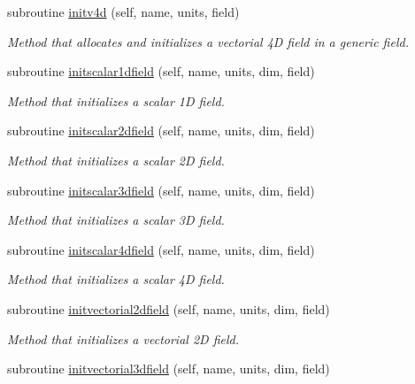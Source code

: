 \begin{DoxyCompactItemize}
subroutine \mbox{\hyperlink{namespacefieldtypes__mod_a08d665678bea0956a323d08863e164e5}{initv4d}} (self, name, units, field)
\begin{DoxyCompactList}\small\item\em Method that allocates and initializes a vectorial 4D field in a generic field. \end{DoxyCompactList}\item 
subroutine \mbox{\hyperlink{namespacefieldtypes__mod_a96ff5318da6a7db8bb61c525315c1c89}{initscalar1dfield}} (self, name, units, dim, field)
\begin{DoxyCompactList}\small\item\em Method that initializes a scalar 1D field. \end{DoxyCompactList}\item 
subroutine \mbox{\hyperlink{namespacefieldtypes__mod_a1a3160727c99017639d758aad9031df5}{initscalar2dfield}} (self, name, units, dim, field)
\begin{DoxyCompactList}\small\item\em Method that initializes a scalar 2D field. \end{DoxyCompactList}\item 
subroutine \mbox{\hyperlink{namespacefieldtypes__mod_a3f2b90bc391ea5b84ead8069ee90f515}{initscalar3dfield}} (self, name, units, dim, field)
\begin{DoxyCompactList}\small\item\em Method that initializes a scalar 3D field. \end{DoxyCompactList}\item 
subroutine \mbox{\hyperlink{namespacefieldtypes__mod_a21dba84bb8fdb02d8bf5fd0052b51283}{initscalar4dfield}} (self, name, units, dim, field)
\begin{DoxyCompactList}\small\item\em Method that initializes a scalar 4D field. \end{DoxyCompactList}\item 
subroutine \mbox{\hyperlink{namespacefieldtypes__mod_ac3e3d9aabba3893d61583e890e3bdf41}{initvectorial2dfield}} (self, name, units, dim, field)
\begin{DoxyCompactList}\small\item\em Method that initializes a vectorial 2D field. \end{DoxyCompactList}\item 
subroutine \mbox{\hyperlink{namespacefieldtypes__mod_a20d935cfa1513350667d04f969be5e26}{initvectorial3dfield}} (self, name, units, dim, field)

\end{DoxyCompactItemize}
